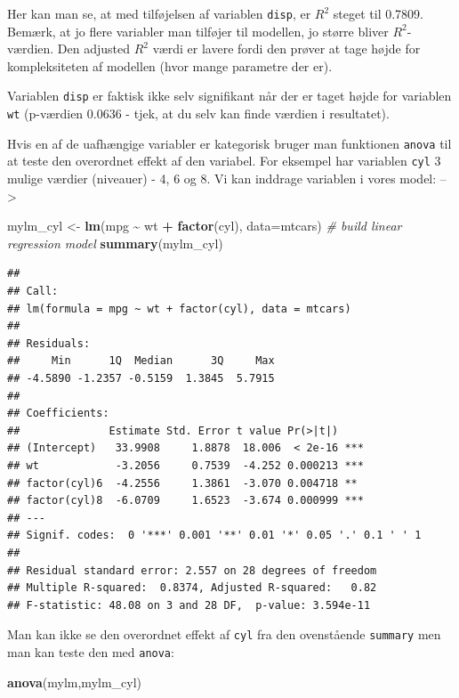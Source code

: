 \documentclass[
]{book}
\newenvironment{Shaded}{\begin{snugshade}}{\end{snugshade}}
\newcommand{\AttributeTok}[1]{\textcolor[rgb]{0.13,0.29,0.53}{#1}}
\newcommand{\CommentTok}[1]{\textcolor[rgb]{0.56,0.35,0.01}{\textit{#1}}}
\newcommand{\FunctionTok}[1]{\textcolor[rgb]{0.13,0.29,0.53}{\textbf{#1}}}
\newcommand{\NormalTok}[1]{#1}
\newcommand{\OtherTok}[1]{\textcolor[rgb]{0.56,0.35,0.01}{#1}}
\newcommand{\SpecialCharTok}[1]{\textcolor[rgb]{0.81,0.36,0.00}{\textbf{#1}}}
\begin{document}
Her kan man se, at med tilføjelsen af variablen \texttt{disp}, er \(R^2\) steget til 0.7809. Bemærk, at jo flere variabler man tilføjer til modellen, jo større bliver \(R^2\)-værdien. Den adjusted \(R^2\) værdi er lavere fordi den prøver at tage højde for kompleksiteten af modellen (hvor mange parametre der er).

Variablen \texttt{disp} er faktisk ikke selv signifikant når der er taget højde for variablen \texttt{wt} (p-værdien 0.0636 - tjek, at du selv kan finde værdien i resultatet).

Hvis en af de uafhængige variabler er kategorisk bruger man funktionen \texttt{anova} til at teste den overordnet effekt af den variabel. For eksempel har variablen \texttt{cyl} 3 mulige værdier (niveauer) - 4, 6 og 8. Vi kan inddrage variablen i vores model: --\textgreater{}

\begin{Shaded}
\begin{Highlighting}[]
\NormalTok{mylm\_cyl }\OtherTok{\textless{}{-}} \FunctionTok{lm}\NormalTok{(mpg }\SpecialCharTok{\textasciitilde{}}\NormalTok{ wt }\SpecialCharTok{+} \FunctionTok{factor}\NormalTok{(cyl), }\AttributeTok{data=}\NormalTok{mtcars) }\CommentTok{\# build linear regression model}
\FunctionTok{summary}\NormalTok{(mylm\_cyl)}
\end{Highlighting}
\end{Shaded}

\begin{verbatim}
## 
## Call:
## lm(formula = mpg ~ wt + factor(cyl), data = mtcars)
## 
## Residuals:
##     Min      1Q  Median      3Q     Max 
## -4.5890 -1.2357 -0.5159  1.3845  5.7915 
## 
## Coefficients:
##              Estimate Std. Error t value Pr(>|t|)    
## (Intercept)   33.9908     1.8878  18.006  < 2e-16 ***
## wt            -3.2056     0.7539  -4.252 0.000213 ***
## factor(cyl)6  -4.2556     1.3861  -3.070 0.004718 ** 
## factor(cyl)8  -6.0709     1.6523  -3.674 0.000999 ***
## ---
## Signif. codes:  0 '***' 0.001 '**' 0.01 '*' 0.05 '.' 0.1 ' ' 1
## 
## Residual standard error: 2.557 on 28 degrees of freedom
## Multiple R-squared:  0.8374, Adjusted R-squared:   0.82 
## F-statistic: 48.08 on 3 and 28 DF,  p-value: 3.594e-11
\end{verbatim}

Man kan ikke se den overordnet effekt af \texttt{cyl} fra den ovenstående \texttt{summary} men man kan teste den med \texttt{anova}:

\begin{Shaded}
\begin{Highlighting}[]
\FunctionTok{anova}\NormalTok{(mylm,mylm\_cyl)}
\end{Highlighting}
\end{Shaded}
\end{document}
